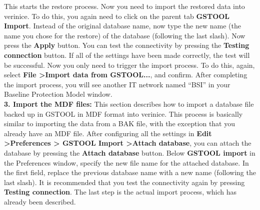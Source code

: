 \documentclass[a4paper,10pt]{book}
\begin{document}
This starts the restore process. Now you need to import the restored data into verinice. To do this, you again need
to click on the parent tab \textbf{GSTOOL Import}. Instead of the original database name, now type the new name (the
name you chose for the restore) of the database (following the last slash). Now press the \textbf{Apply} button.
You can test the connectivity by pressing the \textbf{Testing connection} button. If all of the settings have been made
correctly, the test will be successful. Now you only need to trigger the import process. To do this, again, select
\textbf{File \textgreater Import data from GSTOOL...}, and confirm. After completing the import process, you will see
another IT network named ``BSI''  in your Baseline Protection Model window.
\newline\\
\textbf{3. Import the MDF files:} This section describes how to import a database file backed up in GSTOOL in MDF
format into verinice. This process is basically similar to importing the data from a BAK file, with the exception
that you already have an MDF file. After configuring all the settings in \textbf{Edit \textgreater Preferences \textgreater
GSTOOL Import \textgreater Attach database}, you can attach the database by pressing the \textbf{Attach database} button.
Below \textbf{GSTOOL import} in the Preferences window, specify the new file name for the attached database. In the first
field, replace the previous database name with a new name (following the last slash). It is recommended that you test the
connectivity again by pressing \textbf{Testing connection}. The last step is the actual import process, which has already
been described.
\end{document}

